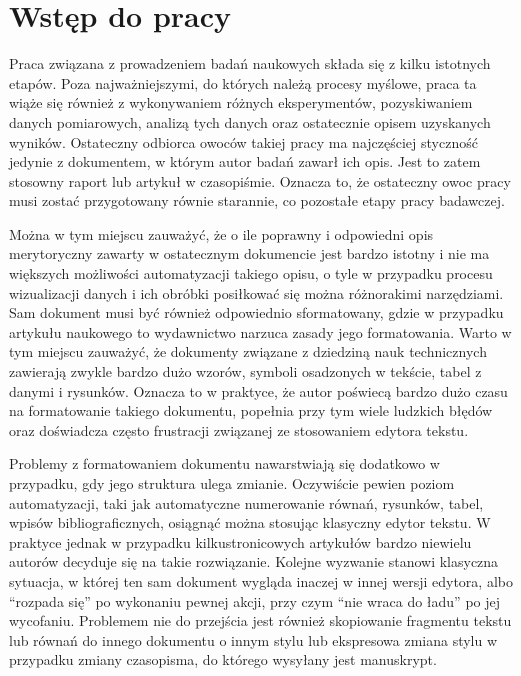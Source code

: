 \chapter{Wstęp do pracy}

Praca związana z prowadzeniem badań naukowych składa się z kilku istotnych etapów. Poza najważniejszymi, do których należą procesy myślowe, praca ta wiąże się również z wykonywaniem różnych eksperymentów, pozyskiwaniem danych pomiarowych, analizą tych danych oraz ostatecznie opisem uzyskanych wyników. Ostateczny odbiorca owoców takiej pracy ma najczęściej styczność jedynie z dokumentem, w którym autor badań zawarł ich opis. Jest to zatem stosowny raport lub artykuł w czasopiśmie. Oznacza to, że ostateczny owoc pracy musi zostać przygotowany równie starannie, co pozostałe etapy pracy badawczej.

Można w tym miejscu zauważyć, że o ile poprawny i odpowiedni opis merytoryczny zawarty w ostatecznym dokumencie jest bardzo istotny i nie ma większych możliwości automatyzacji takiego opisu, o tyle w przypadku procesu wizualizacji danych i ich obróbki posiłkować się można różnorakimi narzędziami. Sam dokument musi być również odpowiednio sformatowany, gdzie w przypadku artykułu naukowego to wydawnictwo narzuca zasady jego formatowania. Warto w tym miejscu zauważyć, że dokumenty związane z dziedziną nauk technicznych zawierają zwykle bardzo dużo wzorów, symboli osadzonych w tekście, tabel z danymi i rysunków. Oznacza to w praktyce, że autor poświecą bardzo dużo czasu na formatowanie takiego dokumentu, popełnia przy tym wiele ludzkich błędów oraz doświadcza często frustracji związanej ze stosowaniem edytora tekstu.

Problemy z formatowaniem dokumentu nawarstwiają się dodatkowo w przypadku, gdy jego struktura ulega zmianie. Oczywiście pewien poziom automatyzacji, taki jak automatyczne numerowanie równań, rysunków, tabel, wpisów bibliograficznych, osiągnąć można stosując klasyczny edytor tekstu. W praktyce jednak w przypadku kilkustronicowych artykułów bardzo niewielu autorów decyduje się na takie rozwiązanie. Kolejne wyzwanie stanowi klasyczna sytuacja, w której ten sam dokument wygląda inaczej w innej wersji edytora, albo \enquote{rozpada się} po wykonaniu pewnej akcji, przy czym \enquote{nie wraca do ładu} po jej wycofaniu. Problemem nie do przejścia jest również skopiowanie fragmentu tekstu lub równań do innego dokumentu o innym stylu lub ekspresowa zmiana stylu w przypadku zmiany czasopisma, do którego wysyłany jest manuskrypt.

